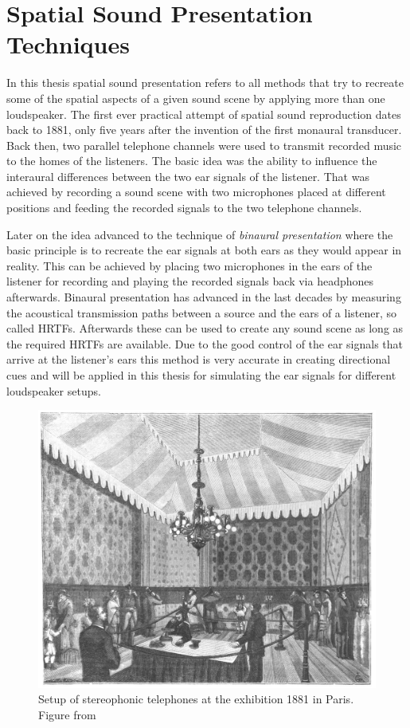 \section{Spatial Sound Presentation Techniques}
\label{sec:spatial_sound_reproduction_and_synthesis_techniques}
%
In this thesis spatial sound presentation refers to all methods that try
to recreate some of the spatial aspects of a given sound scene by applying more
than one loudspeaker.
The first ever practical attempt of spatial sound reproduction dates back to
1881, only five years after the invention of the first monaural transducer.
Back then, two parallel telephone channels were used to transmit recorded
music to the homes of the listeners.\autocite{DuMoncel1881a}
The basic idea was the ability to influence the interaural
differences between the two ear signals of the listener. That was achieved by
recording a sound scene with two microphones placed at different positions 
and feeding the recorded signals to the two telephone channels.

Later on the idea advanced to the technique of \emph{binaural presentation} where the basic
principle is to recreate the ear signals at both ears as they would appear in reality.
This can
be achieved by placing two microphones in the ears of the listener for recording and playing the
recorded signals back via headphones afterwards.
Binaural presentation has advanced in the last decades by measuring the
acoustical transmission paths between a source and the ears of a listener, so called
\acp{HRTF}. Afterwards these can be used to create any sound scene as long as
the required \acp{HRTF} are available. Due to the good control of the ear signals
that arrive at the listener's ears this method is very accurate in creating directional
cues and will be applied in this thesis for simulating the ear signals for
different loudspeaker setups.
%
\begin{figure}[t]
    \centering
    \includegraphics[width=.8\columnwidth]{fig1_03/stereo_telephone}
    \caption{Setup of stereophonic telephones at the exhibition 1881 in
    Paris. Figure from \cite{DuMoncel1881a}
    }
    \label{fig:stereo_telephone}
\end{figure}

